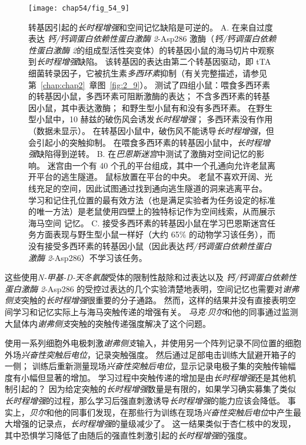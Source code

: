 \begin{figure}[htbp]
	\centering
	\texttt{[image: chap54/fig\_54\_9]}
	\caption{转基因引起的\textit{长时程增强}和空间记忆缺陷是可逆的。
		A. 在来自过度表达 \textit{钙/钙调蛋白依赖性蛋白激酶 2}-Asp286 激酶（\textit{钙/钙调蛋白依赖性蛋白激酶 2}的组成型活性突变体）的转基因小鼠的海马切片中观察到\textit{长时程增强}缺陷。
		该转基因的表达由第二个转基因驱动，即 tTA 细菌转录因子，它被抗生素\textit{多西环素}抑制（有关完整描述，请参见第~\ref{chap:chap2}~章图~\ref{fig:2_9}）。
		测试了四组小鼠：喂食多西环素的转基因小鼠，多西环素可阻断激酶的表达；
		不含多西环素的转基因小鼠，其中表达激酶；
		和野生型小鼠有和没有多西环素。
		在野生型小鼠中，10 赫兹的破伤风会诱发\textit{长时程增强}；
		多西环素没有作用（数据未显示）。
		在转基因小鼠中，破伤风不能诱导\textit{长时程增强}，但会引起小的突触抑制。
		在喂食多西环素的转基因小鼠中，\textit{长时程增强}缺陷得到逆转。
		B. 在\textit{巴恩斯迷宫}中测试了激酶对空间记忆的影响。
		迷宫由一个有 40 个孔的平台组成，其中一个孔通向允许老鼠离开平台的逃生隧道。
		鼠标放置在平台的中央。
		老鼠不喜欢开阔、光线充足的空间，因此试图通过找到通向逃生隧道的洞来逃离平台。
		学习和记住孔位置的最有效方法（也是满足实验者为任务设定的标准的唯一方法）是老鼠使用四壁上的独特标记作为空间线索，从而展示海马空间 记忆。
		C. 接受多西环素的转基因小鼠在学习巴恩斯迷宫任务方面表现与野生型小鼠一样好（大约 65\% 的动物学习该任务），而没有接受多西环素的转基因小鼠（因此表达\textit{钙/钙调蛋白依赖性蛋白激酶 2}-Asp286）不学习该任务。}
	\label{fig:54_9}
\end{figure}


这些使用\textit{N-甲基-D-天冬氨酸}受体的限制性敲除和过表达以及 \textit{钙/钙调蛋白依赖性蛋白激酶 2}-Asp286 的受控过表达的几个实验清楚地表明，空间记忆也需要对\textit{谢弗侧支}突触的\textit{长时程增强}很重要的分子通路。
然而，这样的结果并没有直接表明空间学习和记忆实际上与海马突触传递的增强有关。
\textit{马克$\cdot$贝尔}和他的同事通过监测大鼠体内\textit{谢弗侧支}突触的突触传递强度解决了这个问题。


使用一系列细胞外电极刺激\textit{谢弗侧支}输入，并使用另一个阵列记录不同位置的细胞外场\textit{兴奋性突触后电位}，记录突触强度。
然后通过足部电击训练大鼠避开箱子的一侧；
训练后重新测量现场\textit{兴奋性突触后电位}，显示记录电极子集的突触传输幅度有小幅但显著的增加。
学习过程中突触传递的增加是由\textit{长时程增强}还是其他机制引起的？
因为给定突触的\textit{长时程增强}数量是有限的，如果学习确实募集了类似\textit{长时程增强}的过程，那么学习后强直刺激诱导\textit{长时程增强}的能力应该会降低。
事实上，\textit{贝尔}和他的同事们发现，在那些行为训练在现场\textit{兴奋性突触后电位}中产生最大增强的记录点，\textit{长时程增强}的量级减少了。
这一结果类似于杏仁核中的发现，其中恐惧学习降低了由随后的强直性刺激引起的\textit{长时程增强}的强度。


